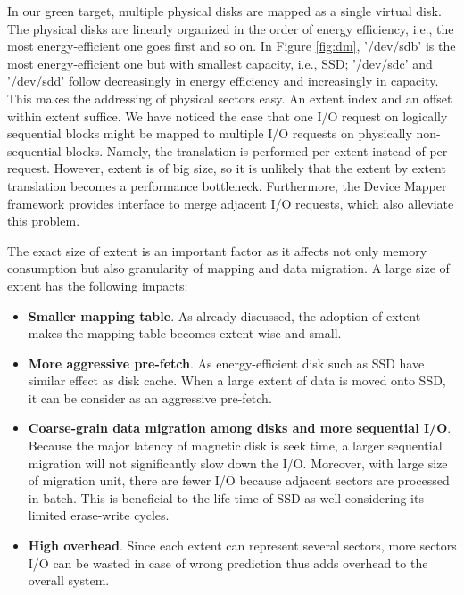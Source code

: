 In our green target, multiple physical disks are mapped as a single
virtual disk. The physical disks are linearly organized in the order
of energy efficiency, i.e., the most energy-efficient one goes first
and so on. In Figure \ref{fig:dm}, '/dev/sdb' is the most
energy-efficient one but with smallest capacity, i.e., SSD; '/dev/sdc'
and '/dev/sdd' follow decreasingly in energy efficiency and
increasingly in capacity. This makes the addressing of physical
sectors easy. An extent index and an offset within extent suffice. We
have noticed the case that one I/O request on logically sequential
blocks might be mapped to multiple I/O requests on physically
non-sequential blocks. Namely, the translation is performed per extent
instead of per request. However, extent is of big size, so it is
unlikely that the extent by extent translation becomes a performance
bottleneck. Furthermore, the Device Mapper framework provides
interface to merge adjacent I/O requests, which also alleviate this
problem.

The exact size of extent is an important factor as it affects not only
memory consumption but also granularity of mapping and data migration.
A large size of extent has the following impacts: 

\begin{itemize} 

\item \textbf{Smaller mapping table}. As already discussed, the
adoption of extent makes the mapping table becomes extent-wise and
small. 

\item \textbf{More aggressive pre-fetch}. As energy-efficient disk such
as SSD have similar effect as disk cache. When a large extent of data
is moved onto SSD, it can be consider as an aggressive pre-fetch. 

\item \textbf{Coarse-grain data migration among disks and more
sequential I/O}. Because the major latency of magnetic disk is seek
time, a larger sequential migration will not significantly slow down
the I/O. Moreover, with large size of migration unit, there are fewer
I/O because adjacent sectors are processed in batch. This is beneficial
to the life time of SSD as well considering its limited erase-write
cycles.

\item \textbf{High overhead}. Since each extent can represent several
sectors, more sectors I/O can be wasted in case of wrong prediction
thus adds overhead to the overall system. 

\end{itemize}

